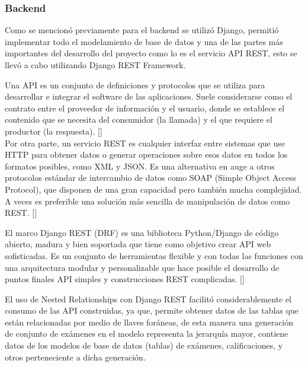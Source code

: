 \documentclass[../Main.tex]{subfiles}
\begin{document}
    \subsubsection{Backend}
    \begin{justify}
    Como se mencionó previamente para el backend se utilizó Django, permitió implementar todo el modelamiento de base de datos y una de las partes más importantes del desarrollo del proyecto como lo es el servicio API REST, esto se llevó a cabo utilizando Django REST Framework.
    
    Una API es un conjunto de definiciones y protocolos que se utiliza para desarrollar e integrar el software de las aplicaciones. Suele considerarse como el contrato entre el proveedor de información y el usuario, donde se establece el contenido que se necesita del consumidor (la llamada) y el que requiere el productor (la respuesta). [] \\ %
    Por otra parte, un servicio REST es cualquier interfaz entre sistemas que use HTTP para obtener datos o generar operaciones sobre esos datos en todos los formatos posibles, como XML y JSON. Es una alternativa en auge a otros protocolos estándar de intercambio de datos como SOAP (Simple Object Access Protocol), que disponen de una gran capacidad pero también mucha complejidad. A veces es preferible una solución más sencilla de manipulación de datos como REST. []  %
    
    \end{justify}
    \begin{justify}
    El marco Django REST (DRF) es una biblioteca Python/Django de código abierto, madura y bien soportada que tiene como objetivo crear API web sofisticadas. Es un conjunto de herramientas flexible y con todas las funciones con una arquitectura modular y personalizable que hace posible el desarrollo de puntos finales API simples y construcciones REST complicadas. [] %
    \end{justify}
    
    \begin{justify}
    El uso de Nested Relationships con Django REST facilitó considerablemente el consumo de las API construidas, ya que, permite obtener datos de las tablas que están relacionadas por medio de llaves foráneas, de esta manera una generación de conjunto de exámenes en el modelo representa la jerarquía mayor, contiene datos de los modelos de base de datos (tablas) de exámenes, calificaciones, y otros perteneciente a dicha generación.
    \end{justify}
    
\end{document}
